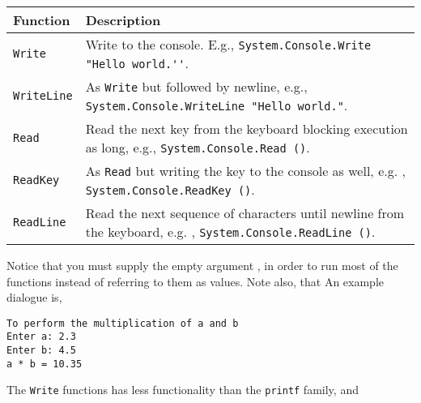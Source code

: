 \begin{center}
  \begin{tabularx}{\linewidth}{|l|X|}
    \hline
    Function & Description\\
    \hline
    \lstinline{Write} & Write to the console. E.g., \lstinline!System.Console.Write "Hello world.''!.\\
    \hline
    \lstinline{WriteLine} & As \lstinline!Write! but followed by newline, e.g., \mbox{\lstinline!System.Console.WriteLine "Hello world."!}.\\
    \hline
    \lstinline{Read} & Read the next key from the keyboard blocking execution as long, e.g., \mbox{\lstinline!System.Console.Read ()!}.\\
    \hline
    \lstinline{ReadKey} & As \lstinline!Read! but writing the key to the console as well, e.g. , \mbox{\lstinline!System.Console.ReadKey ()!}.\\
    \hline
    \lstinline{ReadLine} & Read the next sequence of characters until newline from the keyboard, e.g. , \mbox{\lstinline!System.Console.ReadLine ()!}.\\
    \hline
  \end{tabularx}
\end{center}
Notice that you must supply the empty argument \lexeme{()}, in order to run most of the functions instead of referring to them as values. Note also, that 
%
%
An example dialogue is,
%
\begin{lstlisting}[language=console]
To perform the multiplication of a and b
Enter a: 2.3
Enter b: 4.5
a * b = 10.35
\end{lstlisting}
%
The \lstinline!Write! functions has less functionality than the \lstinline!printf! family, and 
 
